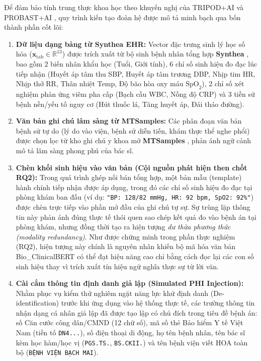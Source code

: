 Để đảm bảo tính trung thực khoa học theo khuyến nghị của TRIPOD+AI \cite{collins2024tripod} và PROBAST+AI \cite{probastai2024bmj}, quy trình kiến tạo đoàn hệ được mô tả minh bạch qua bốn thành phần cốt lõi:
\begin{enumerate}[leftmargin=1.8em, itemsep=0.2em]
    \item \textbf{Dữ liệu dạng bảng từ Synthea EHR:} Vector đặc trưng sinh lý học số hóa ($\bm{x}_{\text{tab}} \in \mathbb{R}^{13}$) được trích xuất từ bộ sinh bệnh nhân tổng hợp \textbf{Synthea} \cite{walonoski2018synthea}, bao gồm $2$ biến nhân khẩu học (Tuổi, Giới tính), $6$ chỉ số sinh hiệu đo đạc lúc tiếp nhận (Huyết áp tâm thu SBP, Huyết áp tâm trương DBP, Nhịp tim HR, Nhịp thở RR, Thân nhiệt Temp, Độ bão hòa oxy máu $\text{SpO}_2$), $2$ chỉ số xét nghiệm phản ứng viêm pha cấp (Bạch cầu WBC, Nồng độ CRP) và $3$ tiền sử bệnh nền/yếu tố nguy cơ (Hút thuốc lá, Tăng huyết áp, Đái tháo đường).
    \item \textbf{Văn bản ghi chú lâm sàng từ MTSamples:} Các phân đoạn văn bản bệnh sử tự do (lý do vào viện, bệnh sử diễn tiến, khám thực thể nghe phổi) được chọn lọc từ kho ghi chú y khoa mở \textbf{MTSamples} \cite{mtsamples2012}, phản ánh ngữ cảnh mô tả lâm sàng phong phú của bác sĩ.
    \item \textbf{Chèn khối sinh hiệu vào văn bản (Cội nguồn phát hiện then chốt RQ2):} Trong quá trình ghép nối bán tổng hợp, một bản mẫu (template) hành chính tiếp nhận được áp dụng, trong đó các chỉ số sinh hiệu đo đạc tại phòng khám ban đầu (ví dụ: \texttt{"BP: 128/82 mmHg, HR: 92 bpm, SpO2: 92\%"}) được chèn trực tiếp vào phần mở đầu của ghi chú tự sự. Sự trùng lặp thông tin này phản ánh đúng thực tế thói quen sao chép kết quả đo vào bệnh án tại phòng khám, nhưng đồng thời tạo ra hiện tượng \textit{dư thừa phương thức (modality redundancy)}. Như được chứng minh trong phần thực nghiệm (RQ2), hiện tượng này chính là nguyên nhân khiến bộ mã hóa văn bản Bio\_ClinicalBERT có thể đạt hiệu năng cao chỉ bằng cách đọc lại các con số sinh hiệu thay vì trích xuất tín hiệu ngữ nghĩa thực sự từ lời văn.
    \item \textbf{Cài cắm thông tin định danh giả lập (Simulated PHI Injection):} Nhằm phục vụ kiểm thử nghiêm ngặt năng lực khử định danh (De-identification) trước khi ứng dụng vào hệ thống thực tế, các trường thông tin nhận dạng cá nhân giả lập đã được tạo lập có chủ đích trong tiêu đề bệnh án: số Căn cước công dân/CMND (12 chữ số), mã số thẻ Bảo hiểm Y tế Việt Nam (tiền tố \texttt{DN4...}), số điện thoại di động, họ tên bệnh nhân, tên bác sĩ kèm học hàm/học vị (\texttt{PGS.TS.}, \texttt{BS.CKII.}) và tên bệnh viện viết HOA toàn bộ (\texttt{BỆNH VIỆN BẠCH MAI}).
\end{enumerate}

